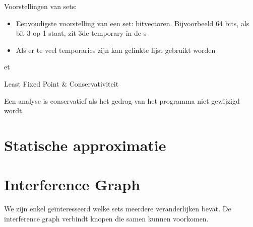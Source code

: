 Voorstellingen van sets:
\begin{itemize}
	\item Eenvoudigste voorstelling van een set: bitvectoren. Bijvoorbeeld 64 bits, als bit 3 op 1 staat, zit 3de temporary in de s
	\item Als er te veel temporaries zijn kan gelinkte lijst gebruikt worden
\end{itemize}et


Least Fixed Point \& Conservativiteit


Een analyse is conservatief als het gedrag van het programma niet gewijzigd wordt.


\section{Statische approximatie}



\section{Interference Graph}
We zijn enkel geïnteresseerd welke sets meerdere veranderlijken bevat. De interference graph verbindt knopen die samen kunnen voorkomen.